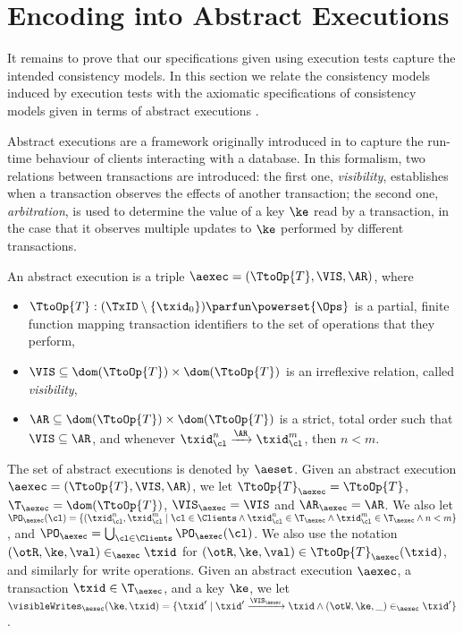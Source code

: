 \section{Encoding into Abstract Executions}
It remains to prove that our specifications given using execution tests 
capture the intended consistency models. 
In this section we relate the consistency models induced by execution tests with 
the axiomatic specifications of consistency models given in terms of abstract executions 
\cite{framework-concur,laws}. 

Abstract executions are a framework originally introduced in \cite{ev-transactions} 
to capture the run-time behaviour of clients interacting with a database. In this 
formalism, two relations between transactions are introduced: the first one, \emph{visibility}, 
establishes when a transaction observes the effects of another transaction; the 
second one,  \emph{arbitration}, is used to determine the value of a key $\ke$ read by 
a transaction, in the case that it observes multiple updates to $\ke$ performed by different 
transactions. 
\begin{definition}
\label{def:absexec}
An abstract execution is a triple $\aexec = (\TtoOp{T}, \VIS, \AR)$, where 
\begin{itemize}
\item $\TtoOp{T}: (\TxID \setminus \{\txid_0\}) \parfun \powerset{\Ops}$ is a partial, 
finite function mapping transaction identifiers to the set of operations that they perform,
\item $\VIS \subseteq \dom(\TtoOp{T}) \times \dom(\TtoOp{T})$ is an irreflexive relation, 
called \emph{visibility}, 
\item $\AR \subseteq \dom(\TtoOp{T}) \times \dom(\TtoOp{T})$ is a strict, total order 
such that $\VIS \subseteq \AR$, and whenever $\txid_{\cl}^{n} \xrightarrow{\AR} 
\txid_{\cl}^{m}$, then $n < m$.
\end{itemize} 
\end{definition}
The set of abstract executions is denoted by $\aeset$.
Given an abstract execution $\aexec = (\TtoOp{T}, \VIS, \AR)$, we let 
$\TtoOp{T}_{\aexec} = \TtoOp{T}$, $\T_{\aexec} = \dom(\TtoOp{T})$, $\VIS_{\aexec} = \VIS$ 
and $\AR_{\aexec} = \AR$. We also let $\PO_{\aexec}(\cl) = \{(\txid_{\cl}^{n}, \txid_{\cl}^{m} \mid \cl \in \Clients 
\wedge  \txid_{\cl}^{n} \in \T_{\aexec} \wedge \txid_{\cl}^{m} \in \T_{\aexec} \wedge n < m\}$, and 
$\PO_{\aexec} = \bigcup_{\cl \in \Clients} \PO_{\aexec}(\cl)$.
We also use the notation $(\otR, \ke, \val) \in_{\aexec} \txid$ for $(\otR, \ke, \val) \in \TtoOp{T}_{\aexec}(\txid)$, 
and similarly for write operations. 
Given an abstract execution $\aexec$, a transaction $\txid \in \T_{\aexec}$, and a key $\ke$, 
we let $\visibleWrites_{\aexec}(\ke, \txid) = \{ \txid' \mid \txid' \xrightarrow{\VIS_{\aexec}} \txid \wedge 
(\otW, \ke, \_) \in_{\aexec} \txid'\}$.


